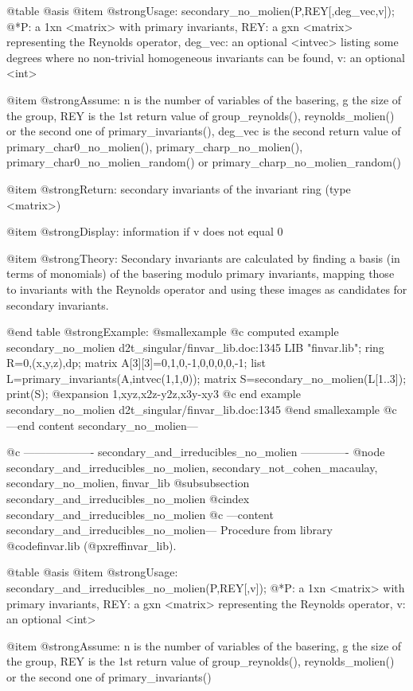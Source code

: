 @table @asis
@item @strong{Usage:}
secondary_no_molien(P,REY[,deg_vec,v]);
@*P: a 1xn <matrix> with primary invariants, REY: a gxn <matrix>
representing the Reynolds operator, deg_vec: an optional <intvec>
listing some degrees where no non-trivial homogeneous invariants can
be found, v: an optional <int>

@item @strong{Assume:}
n is the number of variables of the basering, g the size of the group,
REY is the 1st return value of group_reynolds(), reynolds_molien() or
the second one of primary_invariants(), deg_vec is the second return
value of primary_char0_no_molien(), primary_charp_no_molien(),
primary_char0_no_molien_random() or primary_charp_no_molien_random()

@item @strong{Return:}
secondary invariants of the invariant ring (type <matrix>)

@item @strong{Display:}
information if v does not equal 0

@item @strong{Theory:}
Secondary invariants are calculated by finding a basis (in terms of
monomials) of the basering modulo primary invariants, mapping those to
invariants with the Reynolds operator and using these images as
candidates for secondary invariants.

@end table
@strong{Example:}
@smallexample
@c computed example secondary_no_molien d2t_singular/finvar_lib.doc:1345 
LIB "finvar.lib";
ring R=0,(x,y,z),dp;
matrix A[3][3]=0,1,0,-1,0,0,0,0,-1;
list L=primary_invariants(A,intvec(1,1,0));
matrix S=secondary_no_molien(L[1..3]);
print(S);
@expansion{} 1,xyz,x2z-y2z,x3y-xy3
@c end example secondary_no_molien d2t_singular/finvar_lib.doc:1345
@end smallexample
@c ---end content secondary_no_molien---

@c ------------------- secondary_and_irreducibles_no_molien -------------
@node secondary_and_irreducibles_no_molien, secondary_not_cohen_macaulay, secondary_no_molien, finvar_lib
@subsubsection secondary_and_irreducibles_no_molien
@cindex secondary_and_irreducibles_no_molien
@c ---content secondary_and_irreducibles_no_molien---
Procedure from library @code{finvar.lib} (@pxref{finvar_lib}).

@table @asis
@item @strong{Usage:}
secondary_and_irreducibles_no_molien(P,REY[,v]);
@*P: a 1xn <matrix> with primary invariants, REY: a gxn <matrix>
representing the Reynolds operator, v: an optional <int>

@item @strong{Assume:}
n is the number of variables of the basering, g the size of the group,
REY is the 1st return value of group_reynolds(), reynolds_molien() or
the second one of primary_invariants()

